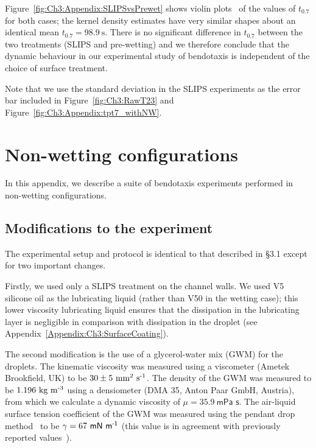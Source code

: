 \begin{subappendices}
Figure~\ref{fig:Ch3:Appendix:SLIPSvsPrewet} shows violin plots~\citep{Hintze1998AmStat} of the values of $t_{0.7}$ for both cases; the kernel density estimates have very similar shapes about an identical mean $t_{0.7} = 98.9~
\si{\second}$. There is no significant difference in $t_{0.7}$ between the two treatments (SLIPS and pre-wetting) and we therefore conclude that the dynamic behaviour in our experimental study of bendotaxis is independent of the choice of surface treatment.

Note that we use the standard deviation in the SLIPS experiments as the error bar included in Figure~\ref{fig:Ch3:RawT23} and Figure~\ref{fig:Ch3:Appendix:tpt7_withNW}.


\section{Non-wetting configurations}\label{Appendix:Ch3:NonWetting}
In this appendix, we describe a suite of bendotaxis experiments performed in non-wetting configurations.
\subsection{Modifications to the experiment}
The experimental setup and protocol is identical to that described in \S3.1 except for two important changes.

Firstly, we used only a SLIPS treatment on the channel walls. We used V5 silicone oil as the lubricating liquid (rather than V50 in the wetting case); this lower viscosity lubricating liquid ensures that the dissipation in the lubricating layer is negligible in comparison with dissipation in the droplet (see Appendix~\ref{Appendix:Ch3:SurfaceCoating}).

The second modification is the use of a glycerol-water mix (GWM) for the droplets. The kinematic viscosity was measured
using a viscometer (Ametek Brookfield, UK) to be $30\pm5~\text{mm\textsuperscript{2}~s\textsuperscript{-1}}$. The density of the GWM was measured to
be $1.196~\text{kg~m\textsuperscript{-3}}$ using a densiometer (DMA 35, Anton Paar GmbH, Austria), from which we calculate a dynamic viscosity of $\mu = 35.9~\textsf{mPa~s}$. The air-liquid surface tension coefficient of the GWM was measured using the pendant drop method~\citep{Stauffer1965Pendant} to be $\gamma = 67~\textsf{mN~m\textsuperscript{-1}}$ (this value is in agreement with previously reported values~\citep{Takamura2012JPetSci}).


\end{subappendices}
